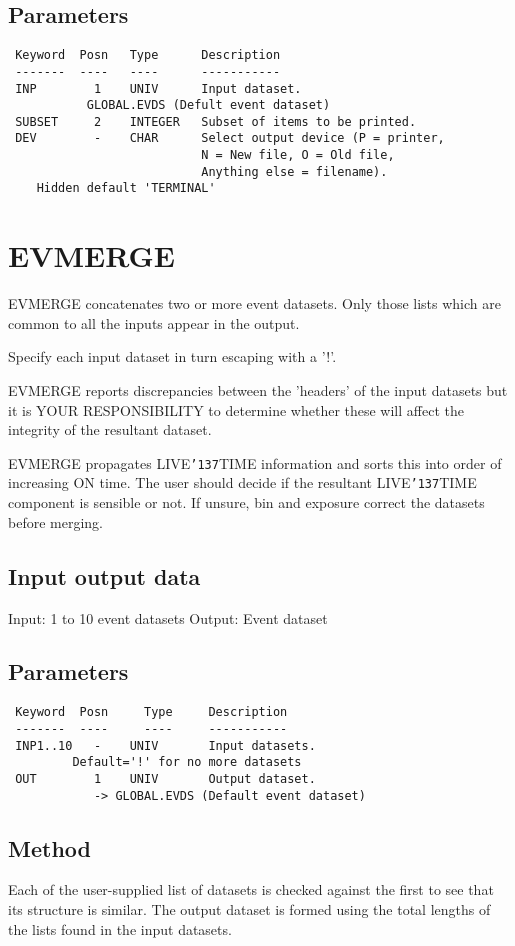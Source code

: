 \documentclass{book}
\renewcommand{\_}{{\tt\char'137}}     %
\begin{document}
\subsection{Parameters}
\begin{verbatim}
 Keyword  Posn   Type      Description
 -------  ----   ----      -----------
 INP        1    UNIV      Input dataset.
           GLOBAL.EVDS (Defult event dataset)
 SUBSET     2    INTEGER   Subset of items to be printed.
 DEV        -    CHAR      Select output device (P = printer,
                           N = New file, O = Old file,
                           Anything else = filename).
    Hidden default 'TERMINAL'

\end{verbatim}\section{EVMERGE}
EVMERGE concatenates two or more event datasets. Only those lists
which are common to all the inputs appear in the output.

Specify each input dataset in turn escaping with a '!'.

EVMERGE reports discrepancies between the 'headers' of the input
datasets but it is YOUR RESPONSIBILITY to determine whether these
will affect the integrity of the resultant dataset.

EVMERGE propagates LIVE\_TIME information and sorts this into order
of increasing ON time. The user should decide if the resultant
LIVE\_TIME component is sensible or not. If unsure, bin and
exposure correct the datasets before merging.
\subsection{Input output data}
Input: 1 to 10 event datasets
Output: Event dataset
\subsection{Parameters}
\begin{verbatim}
 Keyword  Posn     Type     Description
 -------  ----     ----     -----------
 INP1..10   -    UNIV       Input datasets.
         Default='!' for no more datasets
 OUT        1    UNIV       Output dataset.
            -> GLOBAL.EVDS (Default event dataset)

\end{verbatim}\subsection{Method}
Each of the user-supplied list of datasets is checked against the
first to see that its structure is similar. The output dataset is
formed using the total lengths of the lists found in the input
datasets.
\end{document}
